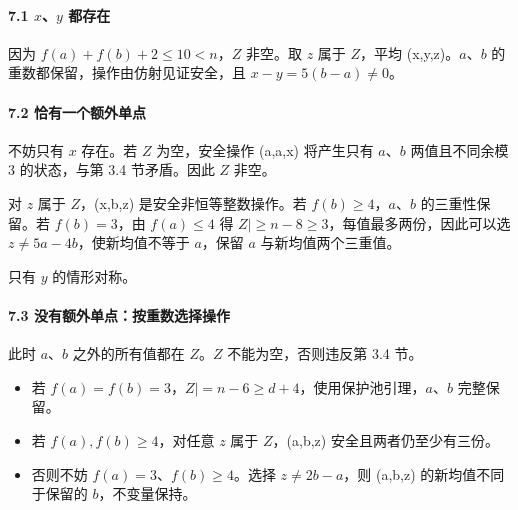 \paragraph*{\texorpdfstring{{7.1} {\ensuremath{x}、\ensuremath{y}} {都存在}}{7.1 、 都存在}}\label{C33-h222}

{因为} {\ensuremath{f(a)+f(b)+2\le 10<n}，\ensuremath{Z}} {非空。取} {\ensuremath{z}} {属于} {\ensuremath{Z}，平均} {(x,y,z)。\ensuremath{a}、\ensuremath{b}} {的重数都保留，操作由仿射见证安全，且} {\ensuremath{x-y=5(b-a)\ne 0}。}

\paragraph*{\texorpdfstring{{7.2} {恰有一个额外单点}}{7.2 恰有一个额外单点}}\label{C33-h223}

{不妨只有} {\ensuremath{x}} {存在。若} {\ensuremath{Z}} {为空，安全操作} {(a,a,x)} {将产生只有} {\ensuremath{a}、\ensuremath{b}} {两值且不同余模} {3} {的状态，与第} {3.4} {节矛盾。因此} {\ensuremath{Z}} {非空。}

{对} {\ensuremath{z}} {属于} {\ensuremath{Z}，(x,b,z)} {是安全非恒等整数操作。若} {\ensuremath{f(b)\ge 4}，\ensuremath{a}、\ensuremath{b}} {的三重性保留。若} {\ensuremath{f(b)=3}，由} {\ensuremath{f(a)\le 4}} {得} {\textbar{}\ensuremath{Z|\ge n-8\ge 3}，每值最多两份，因此可以选} {\ensuremath{z\ne 5a-4b}，使新均值不等于} {\ensuremath{a}，保留} {\ensuremath{a}} {与新均值两个三重值。}

{只有} {\ensuremath{y}} {的情形对称。}

\paragraph*{\texorpdfstring{{7.3} {没有额外单点：按重数选择操作}}{7.3 没有额外单点：按重数选择操作}}\label{C33-h224}

{此时} {\ensuremath{a}、\ensuremath{b}} {之外的所有值都在} {\ensuremath{Z}。\ensuremath{Z}} {不能为空，否则违反第} {3.4} {节。}

\begin{itemize}
\tightlist
\item
  {若} {\ensuremath{f(a)=f(b)=3}，\textbar{}\ensuremath{Z|=n-6\ge d+4}，使用保护池引理，\ensuremath{a}、\ensuremath{b}} {完整保留。}
\item
  {若} {\ensuremath{f(a),f(b)\ge 4}，对任意} {\ensuremath{z}} {属于} {\ensuremath{Z}，(a,b,z)} {安全且两者仍至少有三份。}
\item
  {否则不妨} {\ensuremath{f(a)=3}、\ensuremath{f(b)\ge 4}。选择} {\ensuremath{z\ne 2b-a}，则} {(a,b,z)} {的新均值不同于保留的} {\ensuremath{b}，不变量保持。}
\end{itemize}

